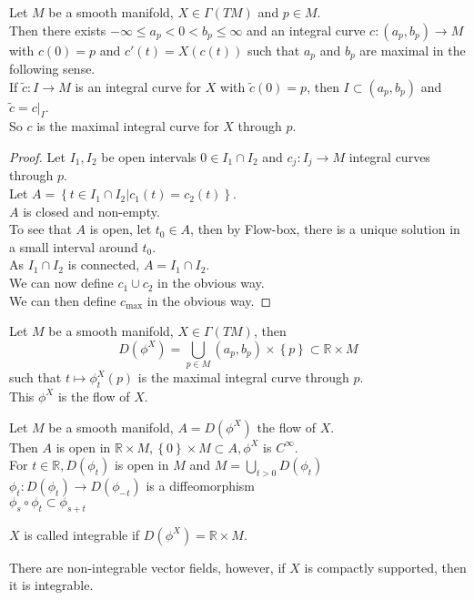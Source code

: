 \documentclass[../main.tex]{subfiles}
\begin{document}
\begin{thm}
	Let $M$ be a smooth manifold, $X\in \Gamma( TM) $ and $p\in M$.\\
	Then there exists $- \infty \leq a_p <0 < b_p \leq \infty $ and an integral curve $c:( a_p,b_p) \to M$ with $c( 0) =p$ and $c'( t) = X( c( t) ) $ such that $a_p$ and $b_p$ are maximal in the following sense.\\
	If $\tilde c: I\to M$ is an integral curve for $X$ with $\tilde c ( 0) =p$, then $I \subset ( a_p,b_p) $ and $\tilde c = c |_{I} $.\\
	So $c$ is the maximal integral curve for $X$ through $p$.
\end{thm}
\begin{proof}
Let $I_1,I_2$ be open intervals $0 \in I_1\cap I_2$ and $c_j:I_j\to M$ integral curves through $p$.\\
Let $A= \left\{ t\in I_1\cap I_2| c_1( t) = c_2( t)  \right\}$.\\
$A$ is closed and non-empty.\\
To see that $A$ is open, let $t_0\in A$, then by Flow-box, there is a unique solution in a small interval around $t_0$.\\
As $I_1\cap I_2$ is connected, $A= I_1\cap I_2$.\\
We can now define $c_1\cup c_2$ in the obvious way.\\
We can then define $c_{\max} $ in the obvious way.
\end{proof}
\begin{defn}
	Let $M$ be a smooth manifold, $X\in \Gamma( TM) $, then
	\[ 
		D( \phi^{X}) = \bigcup_{p \in M} ( a_p,b_p) \times \left\{ p \right\} \subset \mathbb{R}\times M
	\]
	such that $t\mapsto \phi_t^{X}( p) $ is the maximal integral curve through $p$.\\
	This $\phi^{X}$ is the flow of $X$.
\end{defn}
\begin{thm}
	Let $M$ be a smooth manifold, $A=D( \phi^{X} )$ the flow of $X$.\\
	Then $A$ is open in $\mathbb{R}\times M, \left\{ 0 \right\} \times M \subset A, \phi^{X}$  is $ C^{ \infty }$.\\
	For $t\in \mathbb{R}, D( \phi_t) $ is open in $M$ and $M = \bigcup_{t >0} D( \phi_t) $\\
	$\phi_t:D( \phi_t) \to D( \phi_{-t} ) $ is a diffeomorphism\\
	$\phi_{s} \circ\phi_t \subset \phi_{s+t} $ 
\end{thm}
\begin{defn}
	$X$ is called integrable if $D( \phi^{X}) = \mathbb{R}\times M$.
\end{defn}
There are non-integrable vector fields, however, if $X$ is compactly supported, then it is integrable.
				
\end{document}
